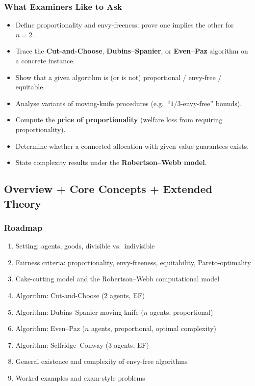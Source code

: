 \separator

\subsubsection*{What Examiners Like to Ask}

\begin{itemize}
  \item Define proportionality and envy-freeness; prove one implies the other for $n=2$.
  \item Trace the \textbf{Cut-and-Choose}, \textbf{Dubins--Spanier}, or \textbf{Even--Paz} algorithm on a concrete instance.
  \item Show that a given algorithm is (or is not) proportional / envy-free / equitable.
  \item Analyse variants of moving-knife procedures (e.g.\ ``$1/3$-envy-free'' bounds).
  \item Compute the \textbf{price of proportionality} (welfare loss from requiring proportionality).
  \item Determine whether a connected allocation with given value guarantees exists.
  \item State complexity results under the \textbf{Robertson--Webb model}.
\end{itemize}

\separator

\subsection{Overview + Core Concepts + Extended Theory}

\subsubsection*{Roadmap}
\begin{enumerate}
  \item Setting: agents, goods, divisible vs.\ indivisible
  \item Fairness criteria: proportionality, envy-freeness, equitability, Pareto-optimality
  \item Cake-cutting model and the Robertson--Webb computational model
  \item Algorithm: Cut-and-Choose (2 agents, EF)
  \item Algorithm: Dubins--Spanier moving knife ($n$ agents, proportional)
  \item Algorithm: Even--Paz ($n$ agents, proportional, optimal complexity)
  \item Algorithm: Selfridge--Conway (3 agents, EF)
  \item General existence and complexity of envy-free algorithms
  \item Worked examples and exam-style problems
\end{enumerate}

